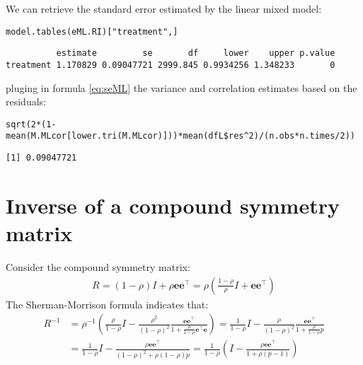 \documentclass[12pt]{article}
\newcommand\Ve{\mathbf{e}}
\newcommand\trans[1]{{#1}^\intercal}%
\begin{document}
We can retrieve the standard error estimated by the linear mixed model:
\lstset{language=r,label= ,caption= ,captionpos=b,numbers=none}
\begin{lstlisting}
model.tables(eML.RI)["treatment",]
\end{lstlisting}

\begin{verbatim}
          estimate         se       df     lower    upper p.value
treatment 1.170829 0.09047721 2999.845 0.9934256 1.348233       0
\end{verbatim}


pluging in formula \autoref{eq:seML} the variance and correlation
estimates based on the residuals:
\lstset{language=r,label= ,caption= ,captionpos=b,numbers=none}
\begin{lstlisting}
sqrt(2*(1-mean(M.MLcor[lower.tri(M.MLcor)]))*mean(dfL$res^2)/(n.obs*n.times/2))
\end{lstlisting}

\begin{verbatim}
[1] 0.09047721
\end{verbatim}




\clearpage

\appendix

\section{Inverse of a compound symmetry matrix}
\label{sm:invCS}
Consider the compound symmetry matrix:
\begin{align*}
R= (1-\rho) I + \rho \Ve\trans{\Ve}= \rho\left(\frac{1-\rho}{\rho} I + \Ve\trans{\Ve}\right) 
\end{align*}
The Sherman-Morrison formula indicates that:
\begin{align*}
R^{-1} &= \rho^{-1} \left(\frac{\rho}{1-\rho} I - \frac{\rho^2}{(1-\rho)^2}\frac{\Ve\trans{\Ve}}{1+\frac{\rho}{1-\rho}\trans{\Ve}\Ve}\right) = \frac{1}{1-\rho} I - \frac{\rho}{(1-\rho)^2}\frac{\Ve\trans{\Ve}}{1+\frac{\rho}{1-\rho}p} \\
&=  \frac{1}{1-\rho} I - \frac{\rho \Ve\trans{\Ve}}{(1-\rho)^2+\rho(1-\rho)p} =  \frac{1}{1-\rho} \left(I - \frac{\rho \Ve\trans{\Ve}}{1+\rho(p-1)}\right)
\end{align*}
\end{document}
